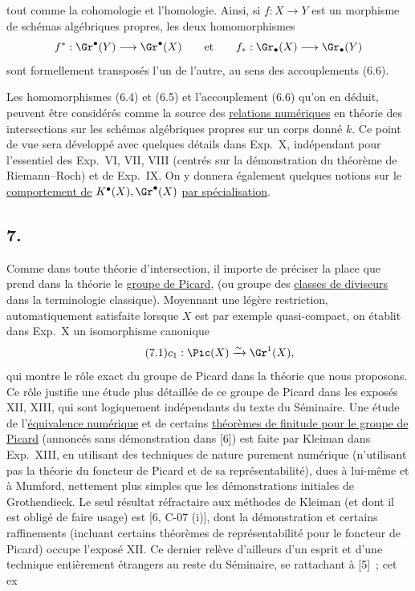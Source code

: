 tout comme la cohomologie et l'homologie. Ainsi, si $f:X\to Y$ est un morphisme de sch\'emas alg\'ebriques propres, les deux homomorphismes
\[
f^*:\Gr^\bullet(Y)\longrightarrow \Gr^\bullet(X)\qquad\text{et}\qquad f_*:\Gr_\bullet(X)\longrightarrow \Gr_\bullet(Y)
\]
sont formellement transpos\'es l'un de l'autre, au sens des accouplements (6.6).

Les homomorphismes (6.4) et (6.5) et l'accouplement (6.6) qu'on en d\'eduit, peuvent \^etre consid\'er\'es comme la source des \uline{relations num\'eriques} en th\'eorie des intersections sur les sch\'emas alg\'ebriques propres sur un corps donn\'e $k$. Ce point de vue sera d\'evelopp\'e avec quelques d\'etails dans Exp.\ X, ind\'ependant pour l'essentiel des Exp.\ VI, VII, VIII (centr\'es sur la d\'emonstration du th\'eor\`eme de Riemann--Roch) et de Exp.\ IX. On y donnera \'egalement quelques notions sur le \uline{comportement de} $K^\bullet(X),\Gr^\bullet(X)$ \uline{par sp\'ecialisation}.

\subsection*{7.}
Comme dans toute th\'eorie d'intersection, il importe de pr\'eciser la place que prend dans la th\'eorie le \uline{groupe de Picard}, (ou groupe des \uline{classes de diviseurs} dans la terminologie classique). Moyennant une l\'eg\`ere restriction, automatiquement satisfaite lorsque $X$ est par exemple quasi-compact, on \'etablit dans Exp.\ X un isomorphisme canonique
\begin{equation}\tag{7.1}
c_1:\Pic(X)\xrightarrow{\sim}\Gr^1(X),
\end{equation}
qui montre le r\^ole exact du groupe de Picard dans la th\'eorie que nous proposons. Ce r\^ole justifie une \'etude plus d\'etaill\'ee de ce groupe de Picard dans les expos\'es XII, XIII, qui sont logiquement ind\'ependants du texte du S\'eminaire. Une \'etude de l'\uline{\'equivalence num\'erique} et de certains \uline{th\'eor\`emes de finitude pour le groupe de Picard} (annonc\'es sans d\'emonstration dans [6]) est faite par Kleiman dans Exp.\ XIII, en utilisant des techniques de nature purement num\'erique (n'utilisant pas la th\'eorie du foncteur de Picard et de sa repr\'esentabilit\'e), dues \`a lui-m\^eme et \`a Mumford, nettement plus simples que les d\'emonstrations initiales de Grothendieck. Le seul r\'esultat r\'efractaire aux m\'ethodes de Kleiman (et dont il est oblig\'e de faire usage) est [6, C-07 (i)], dont la d\'emonstration et certains raffinements (incluant certains th\'eor\`emes de repr\'esentabilit\'e pour le foncteur de Picard) occupe l'expos\'e XII. Ce dernier rel\`eve d'ailleurs d'un esprit et d'une technique enti\`erement \'etrangers au reste du S\'eminaire, se rattachant \`a [5]~; cet ex%
